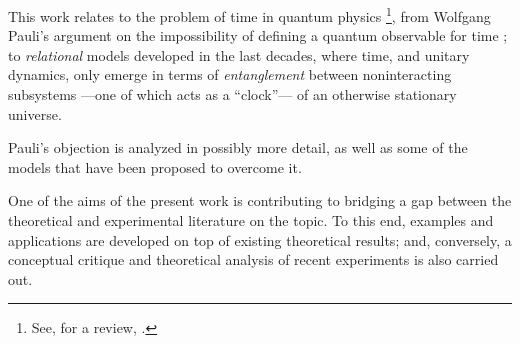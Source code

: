 This work relates to the problem of time in quantum physics%
\footnote{
  See, for a review, \cite{TQM1, TQM2}.
},
from Wolfgang Pauli's argument
on the impossibility of defining a quantum observable for time \parencite{PauliFootnote};
to \emph{relational} models developed in the last decades,
where
time, and unitary dynamics, only emerge in
terms of \emph{entanglement} between noninteracting subsystems
---one of which acts as a ``clock''---
of an otherwise stationary universe. \parencite{PageWootters, Marletto:Evolution}

Pauli's objection is analyzed in possibly more detail, as well as some of the models
that have been proposed
to overcome it. 

One of the aims of the present work
is contributing to bridging a gap between the theoretical
and experimental literature on the topic.
To this end, examples and applications are developed on top of existing theoretical results;
and, conversely,
a conceptual critique and theoretical analysis
of recent experiments is also carried out.
